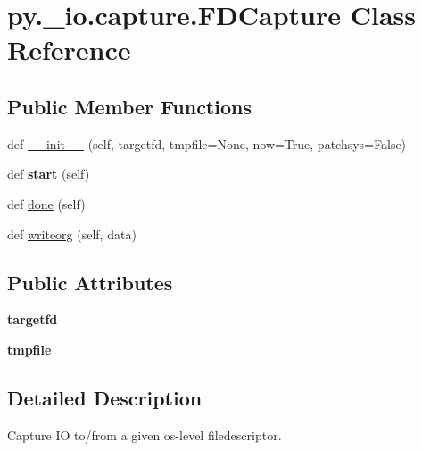 \hypertarget{classpy_1_1__io_1_1capture_1_1_f_d_capture}{}\section{py.\+\_\+io.\+capture.\+F\+D\+Capture Class Reference}
\label{classpy_1_1__io_1_1capture_1_1_f_d_capture}
\subsection*{Public Member Functions}
\begin{DoxyCompactItemize}
\item 
def \hyperlink{classpy_1_1__io_1_1capture_1_1_f_d_capture_aa65e767565e80eaa2770917cc5d2ceec}{\+\_\+\+\_\+init\+\_\+\+\_\+} (self, targetfd, tmpfile=None, now=True, patchsys=False)
\item 
\mbox{\label{classpy_1_1__io_1_1capture_1_1_f_d_capture_a59c1dc63e94aa96afb2d9d39637b948d}} 
def {\bfseries start} (self)
\item 
def \hyperlink{classpy_1_1__io_1_1capture_1_1_f_d_capture_a6816f0c6c3af5924565a252050255b59}{done} (self)
\item 
def \hyperlink{classpy_1_1__io_1_1capture_1_1_f_d_capture_ad296b26bfbeaad94f4fcc4db00fec633}{writeorg} (self, data)
\end{DoxyCompactItemize}
\subsection*{Public Attributes}
\begin{DoxyCompactItemize}
\item 
\mbox{\label{classpy_1_1__io_1_1capture_1_1_f_d_capture_ae4f47b7a7450294bcf6a58d4a7e4f6c2}} 
{\bfseries targetfd}
\item 
\mbox{\label{classpy_1_1__io_1_1capture_1_1_f_d_capture_a52bf830fda0c85abc6ba5f0df613ba73}} 
{\bfseries tmpfile}
\end{DoxyCompactItemize}


\subsection{Detailed Description}
\begin{DoxyVerb}Capture IO to/from a given os-level filedescriptor. \end{DoxyVerb}
 

